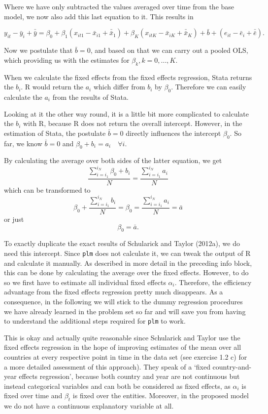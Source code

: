 \documentclass[a4paper,11pt,abstract=on]{scrartcl}
\begin{document}
{{Where we have only subtracted the values averaged over time from the
base model, we now also add this last equation to it. This results in

\[y_{it} - \bar{y}_i + \bar{\bar{y}} = \beta_0 +  \beta_1(x_{it1}-\bar{x}_{i1} + \bar{\bar{x}}_{1}) + \beta_K(x_{itK}-\bar{x}_{iK} + \bar{\bar{x}}_{K}) + \bar{b}  +  (e_{it}- \bar{e}_i + \bar{\bar{e}}).\]

Now we postulate that $\bar{b} = 0$, and based on that we can carry out
a pooled OLS, which providing us with the estimates for
$\beta_k, k = 0,...,K$.

When we calculate the fixed effects from the fixed effects regression,
Stata returns the $b_i$. R would return the $a_i$ which differ from
$b_i$ by $\beta_0$. Therefore we can easily calculate the $a_i$ from the
results of Stata.

Looking at it the other way round, it is a little bit more complicated
to calculate the $b_i$ with R, because R does not return the overall
intercept. However, in the estimation of Stata, the postulate
$\bar{b} = 0$ directly influences the intercept $\beta_0$. So far, we
know $\bar{b} = 0$ and $\beta_0 + b_i = a_i \quad \forall i$.

By calculating the average over both sides of the latter equation, we
get
\[\frac{\sum_{i=i_1}^{i_N} \beta_0 + b_i}{N} = \frac{\sum_{i=i_1}^{i_N} a_i}{N}\]
which can be transformed to
\[\beta_0+\frac{\sum_{i=i_1}^{i_N}  b_i}{N} = \beta_0 = \frac{\sum_{i=i_1}^{i_N}  a_i}{N}=\bar{a}\]
or just \[\beta_0 = \bar{a}.\]
}

To exactly duplicate the exact results of Schularick and Taylor (2012a), we do
need this intercept. Since \texttt{plm} does not calculate it, we can
tweak the output of R and calculate it manually. As described in more
detail in the preceding info block, this can be done by calculating the
average over the fixed effects. However, to do so we first have to
estimate all individual fixed effects $\alpha_i$. Therefore, the
efficiency advantage from the fixed effects regression pretty much
disappears. As a consequence, in the following we will stick to the
dummy regression procedures we have already learned in the problem set
so far and will save you from having to understand the additional steps
required for \texttt{plm} to work.

This is okay and actually quite reasonable since Schularick and Taylor
use the fixed effects regression in the hope of improving estimates of
the mean over all countries at every respective point in time in the
data set (see exercise 1.2 c) for a more detailed assessment
of this approach). They speak of a `fixed country-and-year effects
regression', because both country and year are not continuous but
instead categorical variables and can both be considered as fixed
effects, as $\alpha_i$ is fixed over time and $\beta_t$ is fixed over
the entities. Moreover, in the proposed model we do not have a
continuous explanatory variable at all.

}
\end{document}
